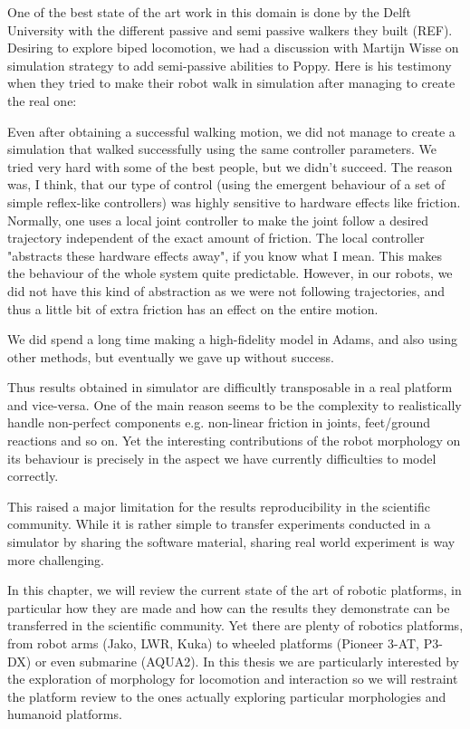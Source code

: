 One of the best state of the art work in this domain is done by the Delft University with the different passive and semi passive walkers they built (REF). Desiring to explore biped locomotion, we had a discussion with Martijn Wisse on simulation strategy to add semi-passive abilities to Poppy. Here is his testimony when they tried to make their robot walk in simulation after managing to create the real one:

\begin{formal}

Even after obtaining a successful walking motion, we did not manage to create a simulation that walked successfully using the same controller parameters. We tried very hard with some of the best people, but we didn’t succeed. The reason was, I think, that our type of control (using the emergent behaviour of a set of simple reflex-like controllers) was highly sensitive to hardware effects like friction. Normally, one uses a local joint controller to make the joint follow a desired trajectory independent of the exact amount of friction. The local controller "abstracts these hardware effects away", if you know what I mean. This makes the behaviour of the whole system quite predictable. However, in our robots, we did not have this kind of abstraction as we were not following trajectories, and thus a little bit of extra friction has an effect on the entire motion.

We did spend a long time making a high-fidelity model in Adams, and also using other methods, but eventually we gave up without success.

\end{formal}

Thus results obtained in simulator are difficultly transposable in a real platform and vice-versa. One of the main reason seems to be the complexity to realistically handle non-perfect components e.g. non-linear friction in joints, feet/ground reactions and so on. Yet the interesting contributions of the robot morphology on its behaviour is precisely in the aspect we have currently difficulties to model correctly.

This raised a major limitation for the results reproducibility in the scientific community. While it is rather simple to transfer experiments conducted in a simulator by sharing the software material, sharing real world experiment is way more challenging.

In this chapter, we will review the current state of the art of robotic platforms, in particular how they are made and how can the results they demonstrate can be transferred in the scientific community. Yet there are plenty of robotics platforms, from robot arms (Jako, LWR, Kuka) to wheeled platforms (Pioneer 3-AT, P3-DX) or even submarine (AQUA2). In this thesis we are particularly interested by the exploration of morphology for locomotion and interaction so we will restraint the platform review to the ones actually exploring particular morphologies and  humanoid platforms.


